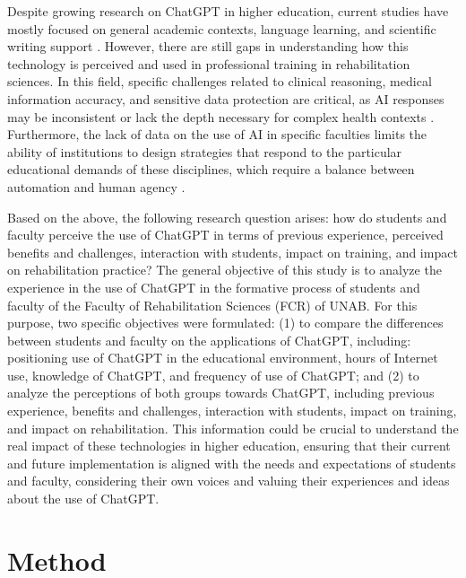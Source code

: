 \documentclass[english]{textolivre}
\begin{document}
Despite growing research on ChatGPT in higher education, current studies have mostly focused on general academic contexts, language learning, and scientific writing support \cite{marinas2025tam,zou2023acceptance}. However, there are still gaps in understanding how this technology is perceived and used in professional training in rehabilitation sciences. In this field, specific challenges related to clinical reasoning, medical information accuracy, and sensitive data protection are critical, as AI responses may be inconsistent or lack the depth necessary for complex health contexts \cite{kelly2025healthcare,marinas2025tam}. Furthermore, the lack of data on the use of AI in specific faculties limits the ability of institutions to design strategies that respond to the particular educational demands of these disciplines, which require a balance between automation and human agency \cite{kelly2025healthcare,unab2024integridade}.

Based on the above, the following research question arises: how do students and faculty perceive the use of ChatGPT in terms of previous experience, perceived benefits and challenges, interaction with students, impact on training, and impact on rehabilitation practice? The general objective of this study is to analyze the experience in the use of ChatGPT in the formative process of students and faculty of the Faculty of Rehabilitation Sciences (FCR) of UNAB. For this purpose, two specific objectives were formulated: (1) to compare the differences between students and faculty on the applications of ChatGPT, including: positioning use of ChatGPT in the educational environment, hours of Internet use, knowledge of ChatGPT, and frequency of use of ChatGPT; and (2) to analyze the perceptions of both groups towards ChatGPT, including previous experience, benefits and challenges, interaction with students, impact on training, and impact on rehabilitation. This information could be crucial to understand the real impact of these technologies in higher education, ensuring that their current and future implementation is aligned with the needs and expectations of students and faculty, considering their own voices and valuing their experiences and ideas about the use of ChatGPT.

\section{Method}\label{sec-normas}
\end{document}
